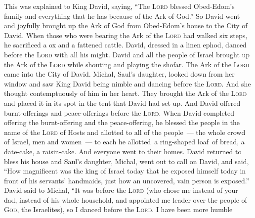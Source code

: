 \begin{inparaenum}
     This was explained to King David, saying, ``The \textsc{Lord} blessed Obed-Edom's family and everything that he has because of the Ark of God.'' So David went and joyfully brought up the Ark of God from Obed-Edom's house to the City of David.%
     When those who were bearing the Ark of the \textsc{Lord} had walked six steps, he sacrificed a ox and a fattened cattle.%
     David, dressed in a linen ephod, danced before the \textsc{Lord} with all his might.%
     David and all the people of Israel brought up the Ark of the \textsc{Lord} while shouting and playing the shofar.%
     The Ark of the \textsc{Lord} came into the City of David. Michal, Saul's daughter, looked down from her window and saw King David being nimble and dancing before the \textsc{Lord}. And she thought contemptuously of him in her heart.%
     They brought the Ark of the \textsc{Lord} and placed it in its spot in the tent that David had set up. And David offered burnt-offerings and peace-offerings before the \textsc{Lord}.%
     When David completed offering the burnt-offering and the peace-offering, he blessed the people in the name of the \textsc{Lord} of Hosts%
     and allotted to all of the people~--- the whole crowd of Israel, men and women~--- to each he allotted\understood\ a ring-shaped loaf\understood\ of bread, a date-cake, a raisin-cake. And everyone went to their homes.%
     David returned to bless his house and Saul's daughter, Michal, went out to call on David, and said, ``How magnificent was the king of Israel today that he exposed himself today in front of his servants' handmaids, just how an uncovered, vain person is exposed.''%
     David said to Michal, ``It was before the \textsc{Lord} (who chose me instead of your dad, instead of his whole household, and appointed me leader over the people of \textsc{God}, the Israelites), so I danced before the \textsc{Lord}.%
     I have been more humble
\end{inparaenum}
